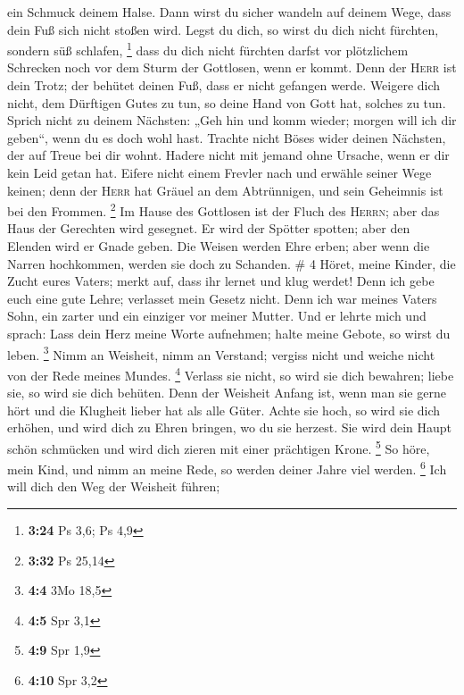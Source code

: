 ein Schmuck deinem Halse.  Dann wirst du sicher wandeln
auf deinem Wege, dass dein Fuß sich nicht stoßen wird. 
Legst du dich, so wirst du dich nicht fürchten, sondern süß schlafen,
\footnote{\textbf{3:24} Ps 3,6; Ps 4,9}  dass du dich
nicht fürchten darfst vor plötzlichem Schrecken noch vor dem Sturm der
Gottlosen, wenn er kommt.  Denn der \textsc{Herr} ist
dein Trotz; der behütet deinen Fuß, dass er nicht gefangen werde.
 Weigere dich nicht, dem Dürftigen Gutes zu tun, so deine
Hand von Gott hat, solches zu tun.  Sprich nicht zu
deinem Nächsten: „Geh hin und komm wieder; morgen will ich dir geben``,
wenn du es doch wohl hast.  Trachte nicht Böses wider
deinen Nächsten, der auf Treue bei dir wohnt.  Hadere
nicht mit jemand ohne Ursache, wenn er dir kein Leid getan hat.
 Eifere nicht einem Frevler nach und erwähle seiner Wege
keinen;  denn der \textsc{Herr} hat Gräuel an dem
Abtrünnigen, und sein Geheimnis ist bei den Frommen. \footnote{\textbf{3:32}
  Ps 25,14}  Im Hause des Gottlosen ist der Fluch des
\textsc{Herrn}; aber das Haus der Gerechten wird gesegnet.
 Er wird der Spötter spotten; aber den Elenden wird er
Gnade geben.  Die Weisen werden Ehre erben; aber wenn die
Narren hochkommen, werden sie doch zu Schanden. \# 4 
Höret, meine Kinder, die Zucht eures Vaters; merkt auf, dass ihr lernet
und klug werdet!  Denn ich gebe euch eine gute Lehre;
verlasset mein Gesetz nicht.  Denn ich war meines Vaters
Sohn, ein zarter und ein einziger vor meiner Mutter.  Und
er lehrte mich und sprach: Lass dein Herz meine Worte aufnehmen; halte
meine Gebote, so wirst du leben. \footnote{\textbf{4:4} 3Mo 18,5}
 Nimm an Weisheit, nimm an Verstand; vergiss nicht und
weiche nicht von der Rede meines Mundes. \footnote{\textbf{4:5} Spr 3,1}
 Verlass sie nicht, so wird sie dich bewahren; liebe sie,
so wird sie dich behüten.  Denn der Weisheit Anfang ist,
wenn man sie gerne hört und die Klugheit lieber hat als alle Güter.
 Achte sie hoch, so wird sie dich erhöhen, und wird dich
zu Ehren bringen, wo du sie herzest.  Sie wird dein Haupt
schön schmücken und wird dich zieren mit einer prächtigen Krone.
\footnote{\textbf{4:9} Spr 1,9}  So höre, mein Kind, und
nimm an meine Rede, so werden deiner Jahre viel werden. \footnote{\textbf{4:10}
  Spr 3,2}  Ich will dich den Weg der Weisheit führen;
